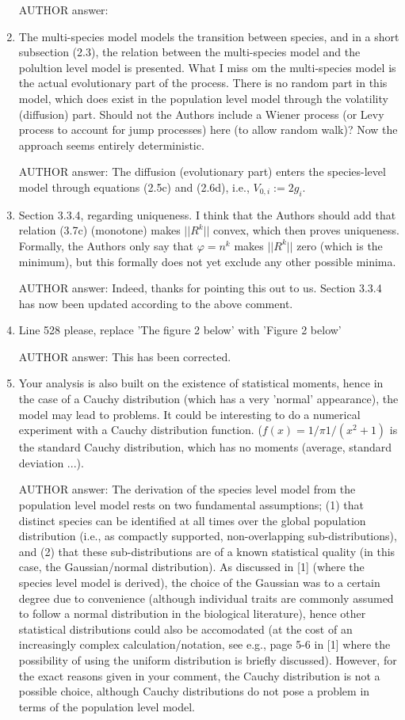 \documentclass[a4paper,11pt]{scrartcl}
\let\phi\varphi
\begin{document}
\begin{enumerate}
AUTHOR answer:

\item
The multi-species model models the transition between species, and in a short subsection (2.3), the relation between the multi-species model and the polultion level model is presented. What I miss om the multi-species model is the actual evolutionary part of the process. There is no random part in this model, which does exist in the population level model through the volatility (diffusion) part. Should not the Authors include a Wiener process (or Levy process to account for jump processes) here (to allow random walk)? Now the approach seems entirely deterministic.

AUTHOR answer: The diffusion (evolutionary part) enters the species-level model through equations (2.5c) and (2.6d), i.e., $V_{0,i} := 2g_i$.

\item
Section 3.3.4, regarding uniqueness. I think that the Authors should add that relation (3.7c) (monotone) makes $||R^k||$ convex, which then proves uniqueness. Formally, the Authors only say that $\phi = n^k$ makes $||R^k||$ zero (which is the minimum), but this formally does not yet exclude any other possible minima.

AUTHOR answer: Indeed, thanks for pointing this out to us. Section 3.3.4 has now been updated according to the above comment.

\item
Line 528 please, replace 'The figure 2 below' with 'Figure 2 below'

AUTHOR answer: This has been corrected.

\item
Your analysis is also built on the existence of statistical moments, hence in the case of a Cauchy distribution (which has a very 'normal' appearance), the model may lead to problems. It could be interesting to do a numerical experiment with a Cauchy distribution function. ($f(x) = 1/\pi 1 / (x^2 + 1)$ is the standard Cauchy distribution, which has no moments (average, standard deviation ...).

AUTHOR answer: The derivation of the species level model from the population level model rests on two fundamental assumptions; (1) that distinct species can be identified at all times over the global population distribution (i.e., as compactly supported, non-overlapping sub-distributions), and (2) that these sub-distributions are of a known statistical quality (in this case, the Gaussian/normal distribution). As discussed in [1] (where the species level model is derived), the choice of the Gaussian was to a certain degree due to convenience (although individual traits are commonly assumed to follow a normal distribution in the biological literature), hence other statistical distributions could also be accomodated (at the cost of an increasingly complex calculation/notation, see e.g., page 5-6 in [1] where the possibility of using the uniform distribution is briefly discussed). However, for the exact reasons given in your comment, the Cauchy distribution is not a possible choice, although Cauchy distributions do not pose a problem in terms of the population level model. \\


\end{enumerate}
\end{document}
